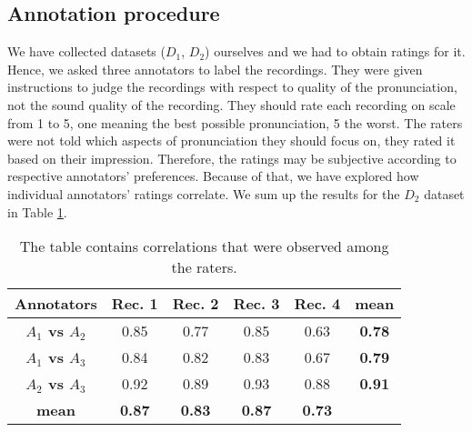 \subsection{Annotation procedure}
We have collected datasets ($D_1$, $D_2$) ourselves and we had to obtain ratings for it.
Hence, we asked three annotators to label the recordings.
They were given instructions to judge the recordings with respect to quality of the pronunciation, not the sound quality of the recording.
They should rate each recording on scale from 1 to 5, one meaning the best possible pronunciation, 5 the worst.
The raters were not told which aspects of pronunciation they should focus on, they rated it based on their impression.
Therefore, the ratings may be subjective according to respective annotators' preferences.
Because of that, we have explored how individual annotators' ratings correlate.
We sum up the results for the $D_2$ dataset in Table \ref{annotatorstbl}.
\begin{table}
\begin{center}
\begin{tabular}{ |c|c|c|c|c|c| } 
 \hline
 \textbf{Annotators} & \textbf{Rec. 1} & \textbf{Rec. 2} & \textbf{Rec. 3} & \textbf{Rec. 4} & \textbf{mean} \\ \hline
\textbf{$A_1$ vs $A_2$} & 0.85 & 0.77 & 0.85 & 0.63 & \textbf{0.78} \\ \hline
\textbf{$A_1$ vs $A_3$} & 0.84 & 0.82 & 0.83 & 0.67 & \textbf{0.79} \\ \hline 
\textbf{$A_2$ vs $A_3$} & 0.92 & 0.89 & 0.93 & 0.88 & \textbf{0.91} \\ \hline 
\textbf{mean} & \textbf{0.87} & \textbf{0.83} & \textbf{0.87} & \textbf{0.73} &  \\ \hline 
 \end{tabular}
\end{center}
\label{annotatorstbl}
\caption{The table contains correlations that were observed among the raters.}
\end{table}
